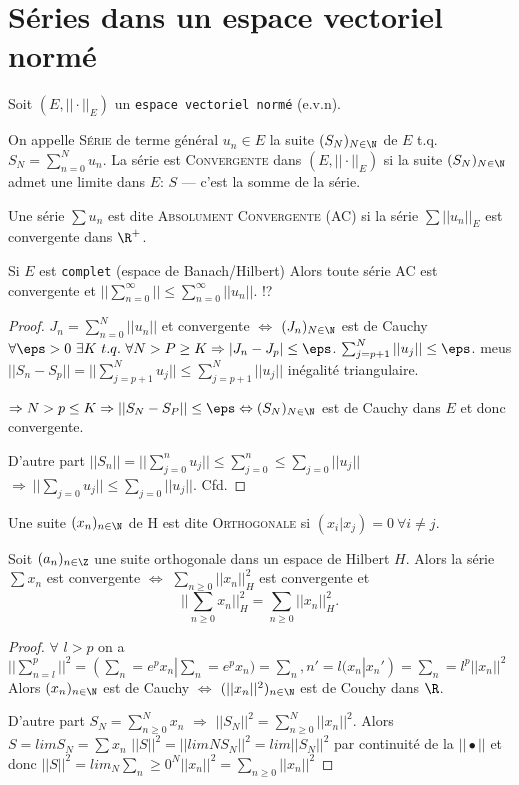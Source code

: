 \section{Séries dans un espace vectoriel normé} %

Soit $(E, ||\cdot||_E)$ un \texttt{espace vectoriel normé} (e.v.n).
\begin{definition}
	On appelle \textsc{Série} de terme général $u_n\in E$ la suite $(S_N)_{N\in \N}$ de $E$ t.q.  $S_N=\sum\limits_{n=0}^Nu_n$.
	La série est \textsc{Convergente} dans $(E, ||\cdot||_E)$ si la suite $(S_N)_{N\in\N}$ admet une limite dans $E$: $S$ --- c'est la somme de la série.
\end{definition}



\begin{definition}
	Une série $\sum u_n$ est dite \textsc{Absolument Convergente} (AC) si la série $\sum ||u_n||_E$ est convergente dans $\R^+$.
\end{definition}

\begin{theorem}
	Si $E$ est \texttt{complet} (espace de Banach/Hilbert) Alors toute série AC est convergente et $||\sum\limits_{n=0}^\infty||\leq \sum\limits_{n=0}^\infty||u_n||$. !?
\end{theorem}
\begin{proof}
	$J_n=\sum\limits_{n=0}^N||u_n||$ et convergente $\Leftrightarrow$ $(J_n)_{N\in\N}$ est de Cauchy $\forall \eps >0\ \exists K\ t.q.\ \forall N>P\geq K\Rightarrow |J_n-J_p|\leq \eps$. $\sum_{j=p+1}^N||u_j||\leq \eps$. meus $||S_n-S_p||=||\sum_{j=p+1}^Nu_j||\leq\sum_{j=p+1}^N ||u_j||$ inégalité triangulaire.
	
	$\Rightarrow N>p\leq K\Rightarrow ||S_N-S_P||\leq \eps \Leftrightarrow (S_N)_{N\in \N}$ est de Cauchy dans $E$ et donc convergente.
	
	D'autre part $||S_n||=||\sum_{j=0}^n u_j||\leq\sum_{j=0}^n\leq \sum_{j=0}||u_j||$ $\Rightarrow\ ||\sum_{j=0}u_j||\leq \sum_{j=0}||u_j||$. Cfd.
\end{proof}

\begin{definition}
	Une suite $(x_n)_{n\in \N}$ de H est dite \textsc{Orthogonale} si $(x_i|x_j)=0\ \forall i≠j$.
\end{definition}

\begin{theorem}
	Soit $(a_n)_{n\in \Z}$ une suite orthogonale dans un espace de Hilbert $H$. Alors la série $∑x_n$ est convergente $\Longleftrightarrow$ $∑_{n≥0}||x_n||_H^2$ est convergente et \[ ||∑_{n≥0}x_n||^2_H=∑_{n≥0}||x_n||_H^2.\]
\end{theorem}
\begin{proof}
	$\forall$ $l>p$ on a $||∑_{n=l}^p||^2=(∑_n=e^p x_n | ∑_n=e^p x_n)=∑_n,n'=l(x_n|x_n')=∑_n=l^p||x_n||^2$ Alors $(x_n)_{n\in \N}$ est de Cauchy $\Leftrightarrow$ $(||x_n||^2)_{n\in \N}$ est de Couchy dans $\R$.

D'autre part $S_N=∑_{n≥0}^N x_n$ $\Rightarrow$  $||S_N||^2=∑_{n≥0}^N||x_n||^2$.
Alors $S=lim S_N=∑x_n$ $||S||^2=||lim N S_N||^2=lim ||S_N||^2$ par continuité de la $||•||$ et donc $||S||^2=lim_N∑_n≥0^N||x_n||^2=∑_{n≥0}||x_n||^2$
\end{proof}

